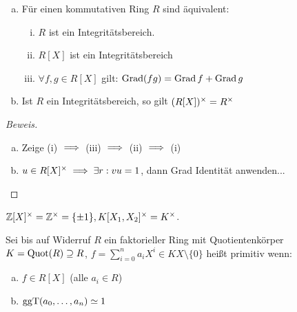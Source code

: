 \documentclass[a4paper]{report}
\begin{document}
\begin{prop}[Übung]\item
  \begin{enumerate}[(a)]
    \item Für einen kommutativen Ring $R$ sind äquivalent:
          \begin{enumerate}[(i)]
            \item $R$ ist ein Integritätsbereich.
            \item $R[X]$ ist ein Integritätsbereich
                  \item $\forall f, g \in R[X]$ gilt: $\operatorname{Grad}(fg) = \operatorname{Grad} f + \operatorname{Grad} g$
          \end{enumerate}
          \item Ist $R$ ein Integritätsbereich, so gilt $(R[X])^\times = R^\times$
  \end{enumerate}
\begin{proof}[Beweis]
\begin{enumerate}[(a)]
  \item Zeige (i) $\implies$ (iii) $\implies $ (ii) $\implies$ (i)
  \item $u \in R[X]^\times \implies \exists r : vu = 1$, dann Grad Identität anwenden...$\qedhere$
\end{enumerate}
\end{proof}
\end{prop}
\begin{bsp*}
$\mathbb{Z}[X]^\times = \mathbb{Z}^\times = \{\pm 1\}, K[X_{1}, X_{2}]^\times = K^\times$.
\end{bsp*}
\begin{defi}
  Sei bis auf Widerruf $R$ ein faktorieller Ring mit Quotientenkörper $K = \operatorname{Quot}(R) \supseteq R$, $f = \sum_{i=0}^{n}a_{i}X^{i} \in K{X} \setminus \{0\}$ heißt primitiv wenn:
  \begin{enumerate}[(a)]
    \item $f \in R[X]$ (alle $a_{i} \in R$)
    \item $\operatorname{ggT}(a_{0}, \ldots, a_{n}) \simeq 1$
  \end{enumerate}
\end{defi}
\end{document}

